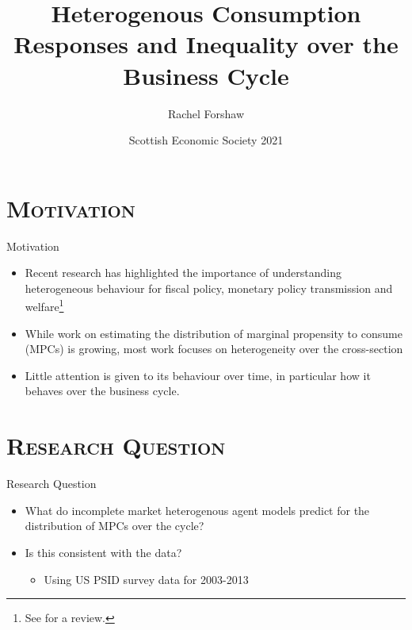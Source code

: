 \documentclass{beamer}
\title{Heterogenous Consumption Responses and Inequality over the Business Cycle}
\author[shortname]{Rachel Forshaw \inst{1}}
\institute[shortinst]{\inst{1} Assistant Professor, Heriot-Watt University}
\date[] %
{Scottish Economic Society 2021}
\begin{document}
\frame{\titlepage}



\section{\scshape Motivation}
\begin{frame}{Motivation}
	\begin{itemize}
		\item Recent research has highlighted the importance of understanding heterogeneous behaviour for fiscal policy, monetary policy transmission and welfare\footnote{See \cite{HeathcodeReview} for a review.}
		\item While work on estimating the distribution of marginal propensity to consume (MPCs) is growing, most work focuses on heterogeneity over the cross-section
		\item Little attention is given to its behaviour over time, in particular how it behaves over the business cycle.
	\end{itemize}
\end{frame}

\section{\scshape Research Question}
\begin{frame}{Research Question}
	\begin{itemize}
	\item What do incomplete market heterogenous agent models predict for the distribution of MPCs over the cycle?
	\item Is this consistent with the data?
	\begin{itemize}
	\item Using US PSID survey data for 2003-2013
	\end{itemize}
	\end{itemize}
	\end{frame}

\end{document}
